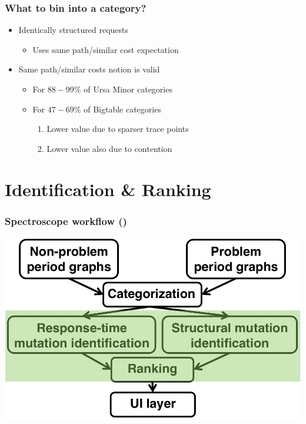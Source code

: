 \documentclass[11pt]{beamer}
\begin{document}
\begin{frame}
\frametitle{What to bin into a category?}
\begin{itemize}
  \item Identically structured requests
  \begin{itemize}
    \item Uses same path/similar cost expectation
  \end{itemize}
  \vskip11pt
  \item Same path/similar costs notion is valid
  \begin{itemize}
    \item For $88-99\%$ of Ursa Minor categories
    \item For $47-69\%$ of Bigtable categories
    \begin{enumerate}
      \item Lower value due to sparser trace points
      \item Lower value also due to contention
    \end{enumerate}
  \end{itemize}
\end{itemize}
\end{frame}

\section{Identification \& Ranking}
\begin{frame}
\frametitle{Spectroscope workflow ()}
\includegraphics[width=\textwidth]{fig/work3.jpg}
\end{frame}
\end{document}
